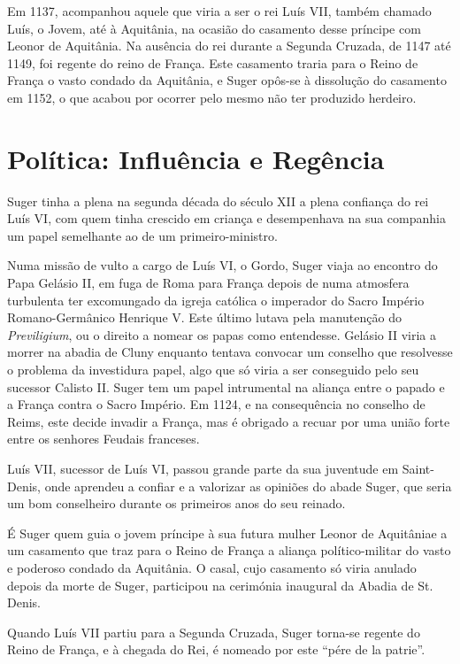 \documentclass{article}
\begin{document}
Em 1137, acompanhou aquele que viria a ser o rei Luís VII, também
chamado Luís, o Jovem, até à Aquitânia, na ocasião do casamento desse
príncipe com Leonor de Aquitânia. Na ausência do rei durante a Segunda
Cruzada, de 1147 até 1149, foi regente do reino de França. Este
casamento traria para o Reino de França o vasto condado da Aquitânia,
e Suger opôs-se à dissolução do casamento em 1152, o que acabou por
ocorrer pelo mesmo não ter produzido herdeiro.

\section{Política: Influência e Regência}

Suger tinha a plena na segunda década do século XII a plena confiança
do rei Luís VI, com quem tinha crescido em criança e desempenhava na
sua companhia um papel semelhante ao de um primeiro-ministro.

Numa missão de vulto a cargo de Luís VI, o Gordo, Suger viaja ao
encontro do Papa Gelásio II, em fuga de Roma para França depois de
numa atmosfera turbulenta ter excomungado da igreja católica o
imperador do Sacro Império Romano-Germânico Henrique V. Este último
lutava pela manutenção do \emph{Previligium}, ou o direito a nomear os
papas como entendesse. Gelásio II viria a morrer na abadia de Cluny
enquanto tentava convocar um conselho que resolvesse o problema da
investidura papel, algo que só viria a ser conseguido pelo seu
sucessor Calisto II.  Suger tem um papel intrumental na aliança entre
o papado e a França contra o Sacro Império. Em 1124, e na consequência
no conselho de Reims, este decide invadir a França, mas é obrigado a
recuar por uma união forte entre os senhores Feudais franceses.

Luís VII, sucessor de Luís VI, passou grande parte da sua juventude em
Saint-Denis, onde aprendeu a confiar e a valorizar as opiniões do
abade Suger, que seria um bom conselheiro durante os primeiros anos do
seu reinado.

É Suger quem guia o jovem príncipe à sua futura mulher Leonor de
Aquitâniae a um casamento que traz para o Reino de França a aliança
político-militar do vasto e poderoso condado da Aquitânia. O casal,
cujo casamento só viria anulado depois da morte de Suger, participou
na cerimónia inaugural da Abadia de St. Denis.

Quando Luís VII partiu para a Segunda Cruzada, Suger torna-se regente
do Reino de França, e à chegada do Rei, é nomeado por este ``pére de
la patrie''.
\end{document}
